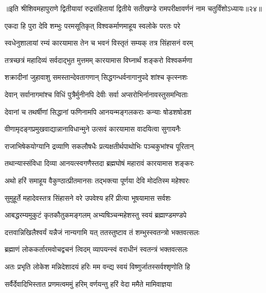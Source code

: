 ॥इति श्रीशिवमहापुराणे द्वितीयायां रुद्रसंहितायां द्वितीये सतीखण्डे रामपरीक्षावर्णनं नाम चतुर्विंशोऽध्यायः॥२४॥




\twolineshloka
{एकदा हि पुरा देवि शम्भुः परमसूतिकृत्}
{विश्वकर्माणमाहूय स्वलोके परतः परे} %

\twolineshloka
{स्वधेनुशालायां रम्यं कारयामास तेन च}
{भवनं विस्तृतं सम्यक् तत्र सिंहासनं वरम्} %

\twolineshloka
{तत्रच्छत्रं महादिव्यं सर्वदाद्भुत मुत्तमम्}
{कारयामास विघ्नार्थं शङ्करो विश्वकर्मणा} %

\twolineshloka
{शक्रादीनां जुहावाशु समस्तान्देवतागणान्}
{सिद्धगन्धर्वनागानुपदे शांश्च कृत्स्नशः} %

\twolineshloka
{देवान् सर्वानागमांश्च विधिं पुत्रैर्मुनीनपि}
{देवीः सर्वा अप्सरोभिर्नानावस्तुसमन्विताः} %

\twolineshloka
{देवानां च तथर्षीणां सिद्धानां फणिनामपि}
{आनयन्मङ्गलकराः कन्याः षोडशषोडश} %

\twolineshloka
{वीणामृदङ्गप्रमुखवाद्यान्नानाविधान्मुने}
{उत्सवं कारयामास वादयित्वा सुगायनैः} %

\twolineshloka
{राजाभिषेकयोग्यानि द्रव्याणि सकलौषधैः}
{प्रत्यक्षतीर्थपाथोभिः पञ्चकुभांश्च पूरितान्} %

\twolineshloka
{तथान्यास्संविधा दिव्या आनयत्स्वगणैस्तदा}
{ब्रह्मघोषं महारावं कारयामास शङ्करः} %

\twolineshloka
{अथो हरिं समाहूय वैकुण्ठात्प्रीतमानसः}
{तद्भक्त्या पूर्णया देवि मोदतिस्म महेश्वरः} %

\twolineshloka
{सुमुहूर्ते महादेवस्तत्र सिंहासने वरे}
{उपवेश्य हरिं प्रीत्या भूषयामास सर्वशः} %

\twolineshloka
{आबद्धरम्यमुकुटं कृतकौतुकमङ्गलम्}
{अभ्यषिञ्चन्महेशस्तु स्वयं ब्रह्माण्डमण्डपे} %

\twolineshloka
{दत्तवान्निखिलैश्वर्यं यन्नैजं नान्यगामि यत्}
{ततस्तुष्टाव तं शम्भुस्स्वतन्त्रो भक्तवत्सलः} %

\twolineshloka
{ब्रह्माणं लोककर्तारमवोचद्वचनं त्विदम्}
{व्यापयन्स्वं वराधीनं स्वतन्त्रं भक्तवत्सलः} %


\twolineshloka
{अतः प्रभृति लोकेश मन्निदेशादयं हरिः}
{मम वन्द्य स्वयं विष्णुर्जातस्सर्वश्शृणोति हि} %

\twolineshloka
{सर्वैर्देवादिभिस्तात प्रणमत्वममुं हरिम्}
{वर्णयन्तु हरिं वेदा ममैते मामिवाज्ञया}%

